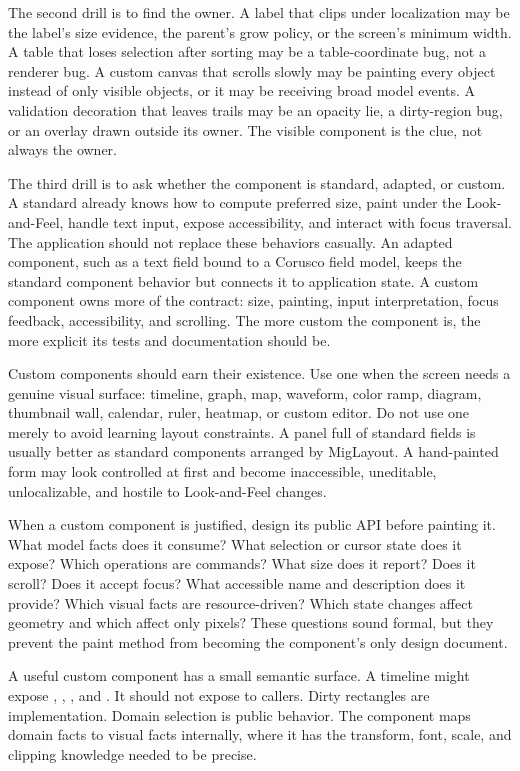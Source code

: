 The second drill is to find the owner. A label that clips under localization may be the label's size evidence, the parent's grow policy, or the screen's minimum width. A table that loses selection after sorting may be a table-coordinate bug, not a renderer bug. A custom canvas that scrolls slowly may be painting every object instead of only visible objects, or it may be receiving broad model events. A validation decoration that leaves trails may be an opacity lie, a dirty-region bug, or an overlay drawn outside its owner. The visible component is the clue, not always the owner.

The third drill is to ask whether the component is standard, adapted, or custom. A standard  already knows how to compute preferred size, paint under the Look-and-Feel, handle text input, expose accessibility, and interact with focus traversal. The application should not replace these behaviors casually. An adapted component, such as a text field bound to a Corusco field model, keeps the standard component behavior but connects it to application state. A custom component owns more of the contract: size, painting, input interpretation, focus feedback, accessibility, and scrolling. The more custom the component is, the more explicit its tests and documentation should be.

Custom components should earn their existence. Use one when the screen needs a genuine visual surface: timeline, graph, map, waveform, color ramp, diagram, thumbnail wall, calendar, ruler, heatmap, or custom editor. Do not use one merely to avoid learning layout constraints. A panel full of standard fields is usually better as standard components arranged by MigLayout. A hand-painted form may look controlled at first and become inaccessible, uneditable, unlocalizable, and hostile to Look-and-Feel changes.

When a custom component is justified, design its public API before painting it. What model facts does it consume? What selection or cursor state does it expose? Which operations are commands? What size does it report? Does it scroll? Does it accept focus? What accessible name and description does it provide? Which visual facts are resource-driven? Which state changes affect geometry and which affect only pixels? These questions sound formal, but they prevent the paint method from becoming the component's only design document.

A useful custom component has a small semantic surface. A timeline might expose , , , and . It should not expose  to callers. Dirty rectangles are implementation. Domain selection is public behavior. The component maps domain facts to visual facts internally, where it has the transform, font, scale, and clipping knowledge needed to be precise.

